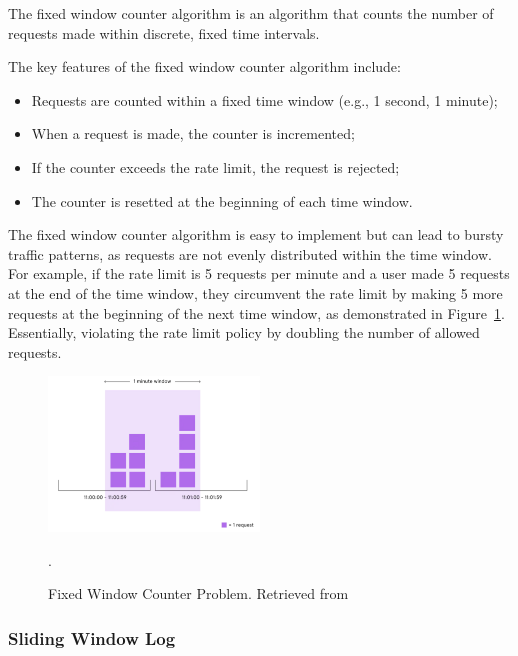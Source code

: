 The fixed window counter algorithm is an algorithm
that counts the number of requests made within discrete, fixed time intervals.

The key features of the fixed window counter algorithm include:

\begin{itemize}
    \item Requests are counted within a fixed time window (e.g., 1 second, 1 minute);
    \item When a request is made, the counter is incremented;
    \item If the counter exceeds the rate limit, the request is rejected;
    \item The counter is resetted at the beginning of each time window.
\end{itemize}

The fixed window counter algorithm is easy to implement but can lead to bursty traffic patterns,
as requests are not evenly distributed within the time window.
For example, if the rate limit is 5 requests per minute and a user made 5 requests at the end of the time window,
they circumvent the rate limit by making 5 more requests at the beginning of the next time window,
as demonstrated in Figure~\ref{fig:fixed-window-counter-problem}.
Essentially, violating the rate limit policy by doubling the number of allowed requests.

\begin{figure}[!htb]
    \centering
    \includegraphics[width=0.5\textwidth]{../figures/06_fixed-window-counter-problem}
    \caption{Fixed Window Counter Problem.
    Retrieved from~\cite{medium-rate-limiting-algorithms}}.
    \label{fig:fixed-window-counter-problem}
\end{figure}

\subsubsection{Sliding Window Log}\label{subsubsec:sliding-window-log-algorithm}

